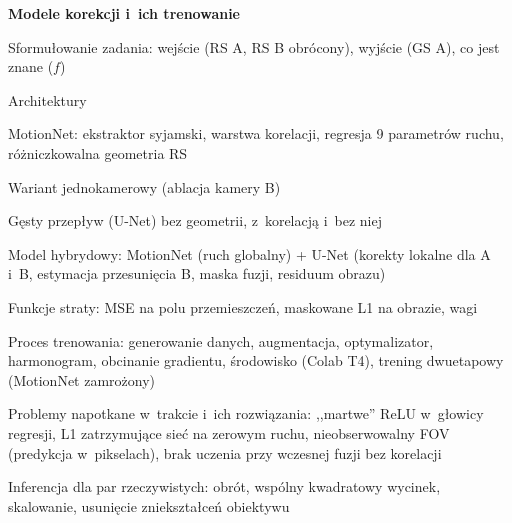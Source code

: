 \begin{toc}
\item \textbf{Modele korekcji i~ich trenowanie} \IK
  \begin{toc}
    \item Sformułowanie zadania: wejście (RS A, RS B obrócony), wyjście (GS A), co jest znane ($f$)
    \item Architektury
      \begin{toc}
        \item MotionNet: ekstraktor syjamski, warstwa korelacji, regresja 9 parametrów ruchu,
              różniczkowalna geometria RS
        \item Wariant jednokamerowy (ablacja kamery B)
        \item Gęsty przepływ (U-Net) bez geometrii, z~korelacją i~bez niej
        \item Model hybrydowy: MotionNet (ruch globalny) + U-Net (korekty lokalne dla A i~B,
              estymacja przesunięcia B, maska fuzji, residuum obrazu)
      \end{toc}
    \item Funkcje straty: MSE na polu przemieszczeń, maskowane L1 na obrazie, wagi
    \item Proces trenowania: generowanie danych, augmentacja, optymalizator, harmonogram,
          obcinanie gradientu, środowisko (Colab T4), trening dwuetapowy (MotionNet zamrożony)
    \item Problemy napotkane w~trakcie i~ich rozwiązania: ,,martwe'' ReLU w~głowicy regresji,
          L1 zatrzymujące sieć na zerowym ruchu, nieobserwowalny FOV (predykcja w~pikselach),
          brak uczenia przy wczesnej fuzji bez korelacji
    \item Inferencja dla par rzeczywistych: obrót, wspólny kwadratowy wycinek, skalowanie,
          usunięcie zniekształceń obiektywu
  \end{toc}


\end{toc}
